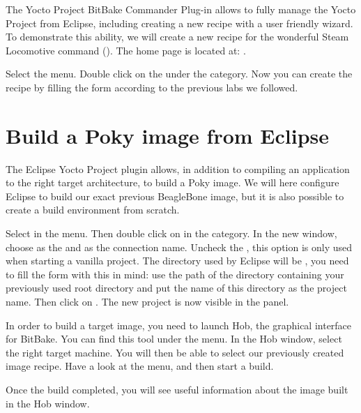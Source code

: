The Yocto Project BitBake Commander Plug-in allows to fully manage the Yocto Project
from Eclipse, including creating a new recipe with a user friendly wizard. To
demonstrate this ability, we will create a new recipe for the wonderful Steam
Locomotive command (). The home page is located at:
.

Select the  menu. Double click on the  under the  category. Now you can
create the recipe by filling the form according to the previous labs we
followed.

\section{Build a Poky image from Eclipse}

The Eclipse Yocto Project plugin allows, in addition to compiling an application
to the right target architecture, to build a Poky image. We will here configure
Eclipse to build our exact previous BeagleBone image, but it is also possible to
create a build environment from scratch.

Select  in the  menu. Then double click on  in the  category. In the new
window, choose  as the  and
 as the connection name. Uncheck the , this option is only used when starting a
vanilla project. The directory used by Eclipse will be , you need to fill the form with this in mind: use the path of the
directory containing your previously used  root directory and put
the name of this directory as the project name. Then click on .
The new project is now visible in the  panel.

In order to build a target image, you need to launch Hob, the graphical
interface for BitBake. You can find this tool under the  menu. In
the Hob window, select the right target machine. You will then be able to select
our previously created image recipe. Have a look at the  menu, and then start a build.

Once the build completed, you will see useful information about the image built
in the Hob window.
